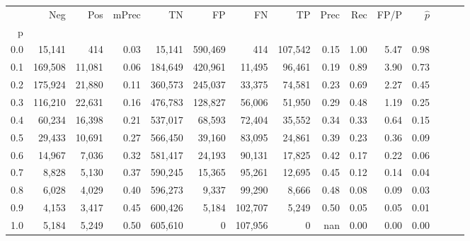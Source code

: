 \begin{tabular}{rrrrrrrrrrrrrrr}
\toprule
{} &      Neg &     Pos & mPrec &       TN &       FP &       FN &       TP &  Prec &   Rec &  FP/P & $\hat{p}$ \\
p   &          &         &       &          &          &          &          &       &       &       &           \\
\midrule
0.0 &   15,141 &     414 &  0.03 &   15,141 &  590,469 &      414 &  107,542 &  0.15 &  1.00 &  5.47 &      0.98 \\
0.1 &  169,508 &  11,081 &  0.06 &  184,649 &  420,961 &   11,495 &   96,461 &  0.19 &  0.89 &  3.90 &      0.73 \\
0.2 &  175,924 &  21,880 &  0.11 &  360,573 &  245,037 &   33,375 &   74,581 &  0.23 &  0.69 &  2.27 &      0.45 \\
0.3 &  116,210 &  22,631 &  0.16 &  476,783 &  128,827 &   56,006 &   51,950 &  0.29 &  0.48 &  1.19 &      0.25 \\
0.4 &   60,234 &  16,398 &  0.21 &  537,017 &   68,593 &   72,404 &   35,552 &  0.34 &  0.33 &  0.64 &      0.15 \\
0.5 &   29,433 &  10,691 &  0.27 &  566,450 &   39,160 &   83,095 &   24,861 &  0.39 &  0.23 &  0.36 &      0.09 \\
0.6 &   14,967 &   7,036 &  0.32 &  581,417 &   24,193 &   90,131 &   17,825 &  0.42 &  0.17 &  0.22 &      0.06 \\
0.7 &    8,828 &   5,130 &  0.37 &  590,245 &   15,365 &   95,261 &   12,695 &  0.45 &  0.12 &  0.14 &      0.04 \\
0.8 &    6,028 &   4,029 &  0.40 &  596,273 &    9,337 &   99,290 &    8,666 &  0.48 &  0.08 &  0.09 &      0.03 \\
0.9 &    4,153 &   3,417 &  0.45 &  600,426 &    5,184 &  102,707 &    5,249 &  0.50 &  0.05 &  0.05 &      0.01 \\
1.0 &    5,184 &   5,249 &  0.50 &  605,610 &        0 &  107,956 &        0 &   nan &  0.00 &  0.00 &      0.00 \\
\bottomrule
\end{tabular}
